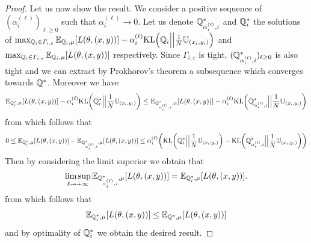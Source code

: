 \begin{proof}
Let us now show the result. We consider a positive sequence of $(\alpha_i^{(\ell)})_{\ell\geq0}$ such that $\alpha_i^{(\ell)}\to 0$.
Let us denote $\mathbb{Q}^{*}_{\alpha_i^{(\ell)},i}$ and $\mathbb{Q}^{*}_i$ the solutions of  $\max_{\QQ_i\in\Gamma_{i,\varepsilon}}\mathbb{E}_{\QQ_i,\mu}\left[\loss(\theta,(x,y))\right]-\alpha_i^{(\ell)}\text{KL}\left(\QQ_i\Big|\Big|\frac{1}{\numsamples}\mathbb{U}_{(x_i,y_i)}\right)$
and 
$\max_{\QQ_i\in\Gamma_{i,\varepsilon}}\mathbb{E}_{\QQ_i,\mu}\left[\loss(\theta,(x,y))\right]$ respectively.  Since $\Gamma_{i,\varepsilon}$ is tight, $(\mathbb{Q}^{*}_{\alpha_i^{(\ell)},i})_{\ell\geq 0}$ is also tight and we can extract by Prokhorov's theorem a subsequence which converges towards $\mathbb{Q}^{*}$. Moreover we have
\begin{align*}
 \mathbb{E}_{\QQ^{*}_i,\mu}\left[\loss(\theta,(x,y))\right] -\alpha_i^{(\ell)}\text{KL}\left(\QQ^{*}_i\Big|\Big|\frac{1}{\numsamples}\mathbb{U}_{(x_i,y_i)}\right)\leq \mathbb{E}_{\QQ^{*}_{\alpha_i^{(\ell)},i},\mu}\left[\loss(\theta,(x,y))\right] -\alpha_i^{(\ell)}\text{KL}\left(\QQ^{*}_{\alpha_i^{(\ell)},i}\Big|\Big|\frac{1}{\numsamples}\mathbb{U}_{(x_i,y_i)}\right)
\end{align*}
from which follows that
\begin{align*}
0\leq \mathbb{E}_{\QQ^{*}_i,\mu}\left[\loss(\theta,(x,y))\right] -  \mathbb{E}_{\QQ^{*}_{\alpha_i^{(\ell)},i},\mu}\left[\loss(\theta,(x,y))\right]\leq \alpha_i^{(\ell)}\left(\text{KL}\left(\QQ^{*}_i\Big|\Big|\frac{1}{\numsamples}\mathbb{U}_{(x_i,y_i)}\right)- \text{KL}\left(\QQ^{*}_{\alpha_i^{(\ell)},i}\Big|\Big|\frac{1}{\numsamples}\mathbb{U}_{(x_i,y_i)}\right)\right)
\end{align*}
Then by considering the limit superior we obtain that
\begin{align*}
    \limsup_{\ell\to+\infty}\mathbb{E}_{\QQ^{*}_{\alpha_i^{(\ell)},i},\mu}\left[\loss(\theta,(x,y))\right] = \mathbb{E}_{\QQ^{*}_i,\mu}\left[\loss(\theta,(x,y))\right].
\end{align*}
from which follows that 
\begin{align*}
 \mathbb{E}_{\QQ^{*}_i,\mu}\left[\loss(\theta,(x,y))\right]\leq \mathbb{E}_{\QQ^{*},\mu}\left[\loss(\theta,(x,y))\right]
\end{align*}
and by optimality of $\mathbb{Q}^{*}_i$ we obtain the desired result. 
\end{proof}



